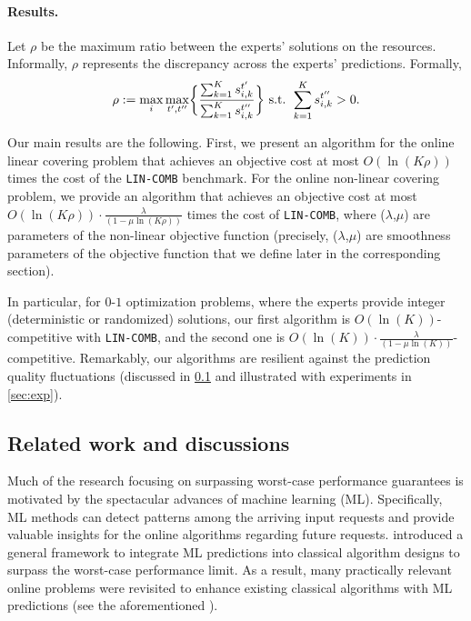 \paragraph{Results.} Let $\rho$ be the maximum ratio between the experts' solutions on the resources.
Informally, $\rho$ represents the discrepancy across the experts' predictions.
Formally,
\[
	\rho := \max_{i} \max_{t',t''} \biggl\{\frac{\sum_{k=1}^{K} s_{i,k}^{t'}}{\sum_{k=1}^{K} s_{i,k}^{t''}} \biggr\}  \textnormal{ s.t. } \sum_{k=1}^{K} s_{i,k}^{t''} > 0.
\]

Our main results are the following.
First, we present an algorithm for the online linear covering problem that achieves an objective cost at most $O(\ln(K\rho))$ times the cost of the \texttt{LIN-COMB} benchmark.
For the online non-linear covering problem, we provide an algorithm that achieves an objective cost at most $O(\ln(K\rho)) \cdot \frac{\lambda}{(1-\mu\ln(K\rho))}$ times the cost of \texttt{LIN-COMB}, where ($\lambda$,$\mu$) are parameters of the non-linear objective function (precisely, ($\lambda$,$\mu$) are smoothness parameters of the objective function that we define later in the corresponding section).

In particular, for $0$-$1$ optimization problems, where the experts provide integer (deterministic or randomized) solutions, our first algorithm is $O(\ln(K))$-competitive with \texttt{LIN-COMB}, and the second one is $O(\ln(K)) \cdot \frac{\lambda}{(1-\mu\ln(K))}$-competitive.
Remarkably, our algorithms are resilient against the prediction quality fluctuations (discussed in \cref{subsec:related-works} and illustrated with experiments in \cref{sec:exp}).


\subsection{Related work and discussions} \label{subsec:related-works}

Much of the research focusing on surpassing worst-case performance guarantees is motivated by the spectacular advances of machine learning (ML). Specifically, ML methods can detect patterns among the arriving input requests and provide valuable insights for the online algorithms regarding future requests. \cite{LykourisVassilvtiskii18:Competitive-caching} introduced a general framework to integrate ML predictions into classical algorithm designs to surpass the worst-case performance limit.
As a result, many practically relevant online problems were revisited to enhance existing classical algorithms with ML predictions (see the aforementioned \cite{LattanziLavastida20:Online-scheduling,Mitzenmacher20:Scheduling-with,LykourisVassilvtiskii18:Competitive-caching,Rohatgi20:Near-optimal-bounds,AntoniadisCoester20:Online-metric,GollapudiPanigrahi19:Online-algorithms,KumarPurohit18:Improving-online,AngelopoulosDurr20:Online-Computation,HsuIndyk19:Learning-Based-Frequency,KraskaBeutel18:The-case-for-learned,Mitzenmacher18:A-model-for-learned,AntoniosEtAll23:mixing-predictions-metric-algorithms}).

